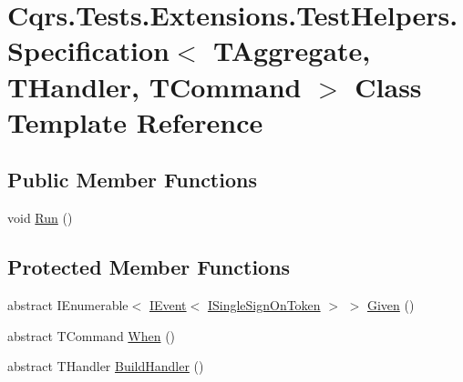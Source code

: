 \hypertarget{classCqrs_1_1Tests_1_1Extensions_1_1TestHelpers_1_1Specification}{}\section{Cqrs.\+Tests.\+Extensions.\+Test\+Helpers.\+Specification$<$ T\+Aggregate, T\+Handler, T\+Command $>$ Class Template Reference}
\label{classCqrs_1_1Tests_1_1Extensions_1_1TestHelpers_1_1Specification}
\subsection*{Public Member Functions}
\begin{DoxyCompactItemize}
\item 
void \hyperlink{classCqrs_1_1Tests_1_1Extensions_1_1TestHelpers_1_1Specification_a97928e7375f3049c5e97792794e7aa37_a97928e7375f3049c5e97792794e7aa37}{Run} ()
\end{DoxyCompactItemize}
\subsection*{Protected Member Functions}
\begin{DoxyCompactItemize}
\item 
abstract I\+Enumerable$<$ \hyperlink{interfaceCqrs_1_1Events_1_1IEvent}{I\+Event}$<$ \hyperlink{interfaceCqrs_1_1Authentication_1_1ISingleSignOnToken}{I\+Single\+Sign\+On\+Token} $>$ $>$ \hyperlink{classCqrs_1_1Tests_1_1Extensions_1_1TestHelpers_1_1Specification_a9996d9316da203e2492ad117bc0ed4b4_a9996d9316da203e2492ad117bc0ed4b4}{Given} ()
\item 
abstract T\+Command \hyperlink{classCqrs_1_1Tests_1_1Extensions_1_1TestHelpers_1_1Specification_a1adc4d52947bd3613ea40559fe9c8a11_a1adc4d52947bd3613ea40559fe9c8a11}{When} ()
\item 
abstract T\+Handler \hyperlink{classCqrs_1_1Tests_1_1Extensions_1_1TestHelpers_1_1Specification_ac3a9d99fb6cde79dfa42167ac013cb7a_ac3a9d99fb6cde79dfa42167ac013cb7a}{Build\+Handler} ()
\end{DoxyCompactItemize}
